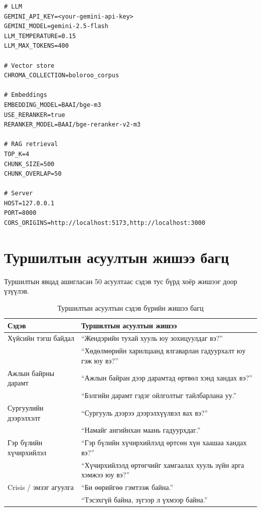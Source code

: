\begin{verbatim}
# LLM
GEMINI_API_KEY=<your-gemini-api-key>
GEMINI_MODEL=gemini-2.5-flash
LLM_TEMPERATURE=0.15
LLM_MAX_TOKENS=400

# Vector store
CHROMA_COLLECTION=boloroo_corpus

# Embeddings
EMBEDDING_MODEL=BAAI/bge-m3
USE_RERANKER=true
RERANKER_MODEL=BAAI/bge-reranker-v2-m3

# RAG retrieval
TOP_K=4
CHUNK_SIZE=500
CHUNK_OVERLAP=50

# Server
HOST=127.0.0.1
PORT=8000
CORS_ORIGINS=http://localhost:5173,http://localhost:3000
\end{verbatim}


\section{Туршилтын асуултын жишээ багц}

Туршилтын явцад ашигласан 50 асуултаас сэдэв тус бүрд хоёр жишээг доор үзүүлэв.

\begin{center}
\begin{table}[!htbp]
\begin{tabular}{|p{4.0cm}|p{9.0cm}|}
\hline
\textbf{Сэдэв} & \textbf{Туршилтын асуултын жишээ} \\ \hline
Хүйсийн тэгш байдал & ``Жендэрийн тухай хууль юу зохицуулдаг вэ?'' \\
                    & ``Хөдөлмөрийн харилцаанд ялгаварлан гадуурхалт юу гэж юу вэ?'' \\ \hline
Ажлын байрны дарамт & ``Ажлын байран дээр дарамтад өртвөл хэнд хандах вэ?'' \\
                    & ``Бэлгийн дарамт гэдэг ойлголтыг тайлбарлана уу.'' \\ \hline
Сургуулийн дээрэлхэлт & ``Сургууль дээрээ дээрэлхүүлвэл яах вэ?'' \\
                       & ``Намайг ангийнхан маань гадуурхдаг.'' \\ \hline
Гэр бүлийн хүчирхийлэл & ``Гэр бүлийн хүчирхийлэлд өртсөн хүн хаашаа хандах вэ?'' \\
                        & ``Хүчирхийлэлд өртөгчийг хамгаалах хууль зүйн арга хэмжээ юу вэ?'' \\ \hline
Crisis / эмзэг агуулга & ``Би өөрийгөө гэмтээж байна.'' \\
                        & ``Тэсэхгүй байна, зүгээр л үхмээр байна.'' \\ \hline
\end{tabular}
\caption[Туршилтын асуултын жишээ]{Туршилтын асуултын сэдэв бүрийн жишээ багц}
\label{tab:appendix-queries}
\end{table}
\end{center}


